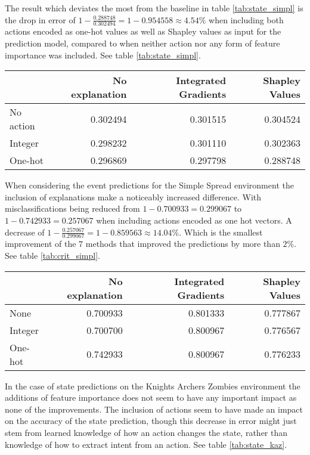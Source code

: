 \documentclass[UKenglish]{uiomasterthesis}
\begin{document}
The result which deviates the most from the baseline in table \ref{tab:state_simpl} is the drop in error of $1 - \frac{0.288748}{0.302494} = 1 - 0.954558 \approx 4.54\%$ when including both actions encoded as one-hot values as well as Shapley values as input for the prediction model, compared to when neither action nor any form of feature importance was included. See table \ref{tab:state_simpl}.

\begin{center}
\label{tab:state_simpl}
\begin{tabular}{lrrr}
\toprule
 & No explanation & Integrated Gradients & Shapley Values \\
\midrule
No action & 0.302494 & 0.301515 & 0.304524 \\
Integer & 0.298232 & 0.301110 & 0.302363 \\
One-hot & 0.296869 & 0.297798 & 0.288748\\
\bottomrule
\end{tabular}
\end{center}


When considering the event predictions for the Simple Spread environment the inclusion of explanations make a noticeably increased difference. With misclassifications being reduced from $1 - 0.700933 = 0.299067$ to $1-0.742933=0.257067$ when including actions encoded as one hot vectors. A decrease of $1 - \frac{0.257067}{0.299067} = 1 - 0.859563 \approx 14.04\%$. Which is the smallest improvement of the $7$ methods that improved the predictions by more than $2\%$. See table \ref{tab:crit_simpl}.

\begin{center}
\label{tab:crit_simpl}
\begin{tabular}{lrrr}
\toprule
 & No explanation & Integrated Gradients & Shapley Values \\
\midrule
    None & 0.700933 & 0.801333 & 0.777867 \\
    Integer & 0.700700 & 0.800967 & 0.776567 \\
    One-hot & 0.742933 & 0.800967 & 0.776233 \\
\bottomrule
\end{tabular}
\end{center}

In the case of state predictions on the Knights Archers Zombies environment the additions of feature importance does not seem to have any important impact as none of the improvements. The inclusion of actions seem to have made an impact on the accuracy of the state prediction, though this decrease in error might just stem from learned knowledge of how an action changes the state, rather than knowledge of how to extract intent from an action. See table \ref{tab:state_kaz}.
\end{document}
